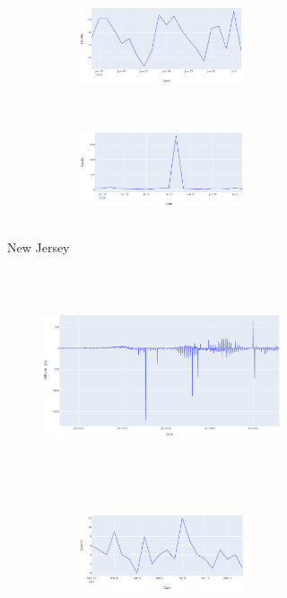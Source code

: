 \documentclass[11pt,twocolumn,letterpaper]{article}
\begin{document}
\begin{figure}
\begin{subfigure}{0.48\linewidth}
\begin{subfigure}{0.48\linewidth}
\begin{subfigure}{\linewidth}
            \centering
            \includegraphics[width=\linewidth, height=3.15cm]{images/nj_cdc.PNG}
            \vfill
        \end{subfigure}
        \begin{subfigure}{\linewidth}
            \centering
            \includegraphics[width=\linewidth, height=3.15cm]{images/nj_jhu.PNG}
            \vfill
        \end{subfigure}
    \end{subfigure}
    \caption{New Jersey}
\end{subfigure}
\hfill
\begin{subfigure}{0.48\linewidth}
    \begin{subfigure}{0.48\linewidth}
        \centering
        \includegraphics[width=\linewidth, height=6.3cm]{images/ok_overview.PNG}
    \end{subfigure}
    \hfill
    \begin{subfigure}{0.48\linewidth}
        \begin{subfigure}{\linewidth}
            \centering
            \includegraphics[width=\linewidth, height=3.15cm]{images/ok_cdc.PNG}

\end{subfigure}
\end{subfigure}
\end{subfigure}
\end{figure}
\end{document}
